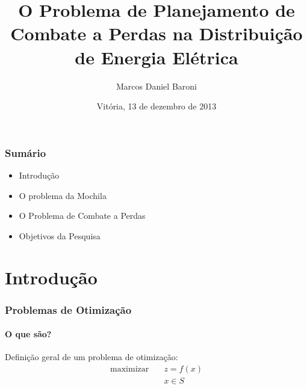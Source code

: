 \documentclass[10pt,fleqn]{beamer}
\title[]{O Problema de Planejamento de Combate a Perdas na Distribuição de
Energia Elétrica}
\subtitle{}
\author{Marcos Daniel Baroni}
\institute[NINFA]{}
\date[Vitória, 13/12/2013]{Vitória, 13 de dezembro de 2013}
\newcommand{\litem}[1]{
  \item{#1 \vspace{9pt}}
}
\begin{document}





\begin{frame}
  \titlepage
\end{frame}

\begin{frame}
  \frametitle{Sumário}
  \begin{itemize}
    \litem{Introdução}
    \litem{O problema da Mochila}
    \litem{O Problema de Combate a Perdas}
    \litem{Objetivos da Pesquisa}
  \end{itemize}
\end{frame}

\section{Introdução}

\begin{frame}
  \frametitle{Problemas de Otimização}
  \framesubtitle{O que são?}
  Definição geral de um problema de otimização:
  \vspace{10pt}
  \begin{align}
    \textrm{maximizar}
      \quad & z = f(x) \nonumber \\
  	  \quad & x \in S \nonumber \\
	  \nonumber
  \end{align}
\end{frame}

\end{document}
